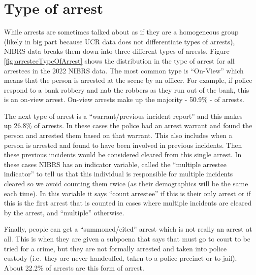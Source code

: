 \documentclass[
]{krantz}
\begin{document}
\section{Type of arrest}\label{type-of-arrest}

While arrests are sometimes talked about as if they are a
homogeneous group (likely in big part because UCR data does
not differentiate types of arrests), NIBRS data breaks them
down into three different types of arrests. Figure
\ref{fig:arresteeTypeOfArrest} shows the distribution in the
type of arrest for all arrestees in the 2022 NIBRS data. The
most common type is ``On-View'' which means that the person
is arrested at the scene by an officer. For example, if
police respond to a bank robbery and nab the robbers as they
run out of the bank, this is an on-view arrest. On-view
arrests make up the majority - 50.9\% - of arrests.

The next type of arrest is a ``warrant/previous incident
report'' and this makes up 26.8\% of arrests. In these cases
the police had an arrest warrant and found the person and
arrested them based on that warrant. This also includes when
a person is arrested and found to have been involved in
previous incidents. Then these previous incidents would be
considered cleared from this single arrest. In these cases
NIBRS has an indicator variable, called the ``multiple
arrestee indicator'' to tell us that this individual is
responsible for multiple incidents cleared so we avoid
counting them twice (as their demographics will be the same
each time). In this variable it says ``count arrestee'' if
this is their only arrest or if this is the first arrest
that is counted in cases where multiple incidents are
cleared by the arrest, and ``multiple'' otherwise.

Finally, people can get a ``summoned/cited'' arrest which is
not really an arrest at all. This is when they are given a
subpoena that says that must go to court to be tried for a
crime, but they are not formally arrested and taken into
police custody (i.e.~they are never handcuffed, taken to a
police precinct or to jail). About 22.2\% of arrests are
this form of arrest.
\end{document}
